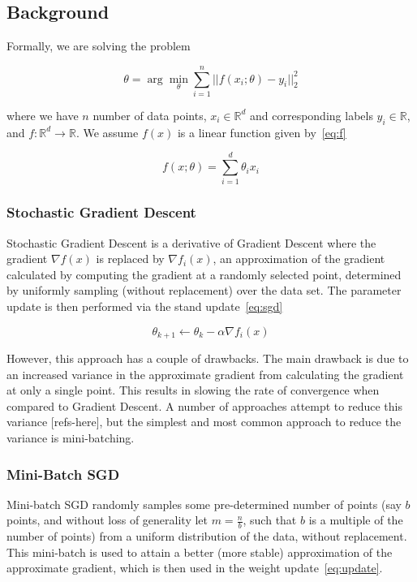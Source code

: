 \documentclass[conference,compsoc]{IEEEtran}
\begin{document}
\subsection{Background}
Formally, we are solving the problem

\begin{equation}\label{eq:update}
    \theta = \arg \min_{\theta} \sum_{i=1}^n ||f(x_i; \theta) - y_i||_2^2
\end{equation}

where we have $n$ number of data points, $x_i \in \mathbb{R}^d$ and
corresponding labels $y_i \in \mathbb{R}$, and $f: \mathbb{R}^d \rightarrow
\mathbb{R}$. We assume $f(x)$ is a linear function given by~\ref{eq:f}

\begin{equation}\label{eq:f}
    f(x; \theta) = \sum_{i = 1}^d \theta_i x_i
\end{equation}


\subsubsection{Stochastic Gradient Descent}
Stochastic Gradient Descent is a derivative of Gradient Descent where the
gradient $\nabla f(x)$ is replaced by $\nabla f_i(x)$, an approximation of the
gradient calculated by computing the gradient at a randomly selected point,
determined by uniformly sampling (without replacement) over the data set. The
parameter update is then performed via the stand update~\ref{eq:sgd}

\begin{equation}\label{eq:sgd}
    \theta_{k+1} \gets \theta_k - \alpha \nabla f_i(x)
\end{equation}

However, this approach has a couple of drawbacks. The main drawback is due to an
increased variance in the approximate gradient from calculating the gradient at
only a single point. This results in slowing the rate of convergence when
compared to Gradient Descent. A number of approaches attempt to reduce this
variance [refs-here], but the simplest and most common approach to reduce the
variance is mini-batching.

\subsubsection{Mini-Batch SGD}
Mini-batch SGD randomly samples some pre-determined number of points (say $b$
points, and without loss of generality let $m = \frac{n}{b}$, such that $b$ is a
multiple of the number of points) from a uniform distribution of the data,
without replacement. This mini-batch is used to attain a better (more stable)
approximation of the approximate gradient, which is then used in the weight
update~\ref{eq:update}.
\end{document}
